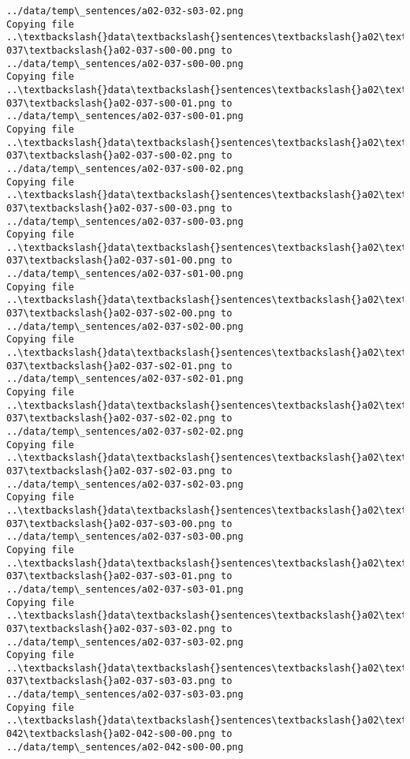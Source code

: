 \documentclass[11pt]{article}
\begin{document}
\begin{Verbatim}[commandchars=\\\{\}]
../data/temp\_sentences/a02-032-s03-02.png
Copying file ..\textbackslash{}data\textbackslash{}sentences\textbackslash{}a02\textbackslash{}a02-037\textbackslash{}a02-037-s00-00.png to
../data/temp\_sentences/a02-037-s00-00.png
Copying file ..\textbackslash{}data\textbackslash{}sentences\textbackslash{}a02\textbackslash{}a02-037\textbackslash{}a02-037-s00-01.png to
../data/temp\_sentences/a02-037-s00-01.png
Copying file ..\textbackslash{}data\textbackslash{}sentences\textbackslash{}a02\textbackslash{}a02-037\textbackslash{}a02-037-s00-02.png to
../data/temp\_sentences/a02-037-s00-02.png
Copying file ..\textbackslash{}data\textbackslash{}sentences\textbackslash{}a02\textbackslash{}a02-037\textbackslash{}a02-037-s00-03.png to
../data/temp\_sentences/a02-037-s00-03.png
Copying file ..\textbackslash{}data\textbackslash{}sentences\textbackslash{}a02\textbackslash{}a02-037\textbackslash{}a02-037-s01-00.png to
../data/temp\_sentences/a02-037-s01-00.png
Copying file ..\textbackslash{}data\textbackslash{}sentences\textbackslash{}a02\textbackslash{}a02-037\textbackslash{}a02-037-s02-00.png to
../data/temp\_sentences/a02-037-s02-00.png
Copying file ..\textbackslash{}data\textbackslash{}sentences\textbackslash{}a02\textbackslash{}a02-037\textbackslash{}a02-037-s02-01.png to
../data/temp\_sentences/a02-037-s02-01.png
Copying file ..\textbackslash{}data\textbackslash{}sentences\textbackslash{}a02\textbackslash{}a02-037\textbackslash{}a02-037-s02-02.png to
../data/temp\_sentences/a02-037-s02-02.png
Copying file ..\textbackslash{}data\textbackslash{}sentences\textbackslash{}a02\textbackslash{}a02-037\textbackslash{}a02-037-s02-03.png to
../data/temp\_sentences/a02-037-s02-03.png
Copying file ..\textbackslash{}data\textbackslash{}sentences\textbackslash{}a02\textbackslash{}a02-037\textbackslash{}a02-037-s03-00.png to
../data/temp\_sentences/a02-037-s03-00.png
Copying file ..\textbackslash{}data\textbackslash{}sentences\textbackslash{}a02\textbackslash{}a02-037\textbackslash{}a02-037-s03-01.png to
../data/temp\_sentences/a02-037-s03-01.png
Copying file ..\textbackslash{}data\textbackslash{}sentences\textbackslash{}a02\textbackslash{}a02-037\textbackslash{}a02-037-s03-02.png to
../data/temp\_sentences/a02-037-s03-02.png
Copying file ..\textbackslash{}data\textbackslash{}sentences\textbackslash{}a02\textbackslash{}a02-037\textbackslash{}a02-037-s03-03.png to
../data/temp\_sentences/a02-037-s03-03.png
Copying file ..\textbackslash{}data\textbackslash{}sentences\textbackslash{}a02\textbackslash{}a02-042\textbackslash{}a02-042-s00-00.png to
../data/temp\_sentences/a02-042-s00-00.png

\end{Verbatim}
\end{document}
